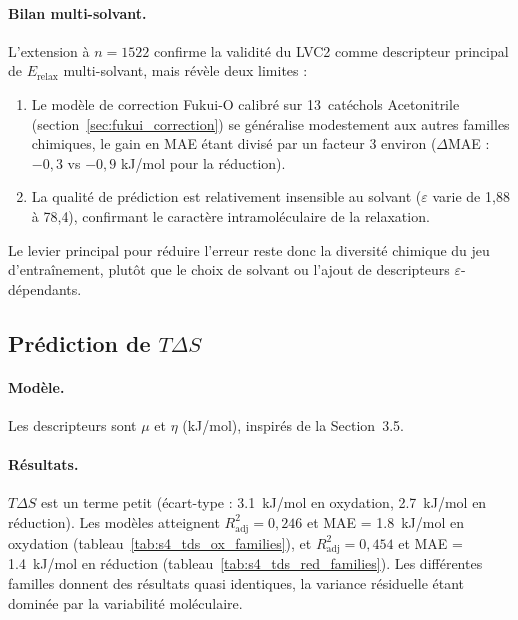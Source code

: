 \paragraph{Bilan multi-solvant.}
L'extension à $n = 1522$ confirme la validité du LVC2 comme descripteur principal de $E_\text{relax}$ multi-solvant, mais révèle deux limites :
\begin{enumerate}
    \item Le modèle de correction Fukui-O calibré sur 13~catéchols Acetonitrile (section~\ref{sec:fukui_correction}) se généralise modestement aux autres familles chimiques, le gain en MAE étant divisé par un facteur 3 environ ($\Delta$MAE : $-0{,}3$ vs $-0{,}9$ kJ/mol pour la réduction).
    \item La qualité de prédiction est relativement insensible au solvant ($\varepsilon$ varie de 1{,}88 à 78{,}4), confirmant le caractère intramoléculaire de la relaxation.
\end{enumerate}
Le levier principal pour réduire l'erreur reste donc la diversité chimique du jeu d'entraînement, plutôt que le choix de solvant ou l'ajout de descripteurs $\varepsilon$-dépendants.

\subsection{Prédiction de \texorpdfstring{$T\Delta S$}{TdS}}
\label{subsec:s4_tds}

\paragraph{Modèle.}
Les descripteurs sont $\mu$ et $\eta$ (kJ/mol), inspirés de la Section~3.5.

\paragraph{Résultats.}
$T\Delta S$ est un terme petit (écart-type : \SI{3.1}{kJ/mol} en oxydation, \SI{2.7}{kJ/mol} en réduction). Les modèles atteignent $R^2_\text{adj} = 0{,}246$ et MAE = \SI{1.8}{kJ/mol} en oxydation (tableau~\ref{tab:s4_tds_ox_families}), et $R^2_\text{adj} = 0{,}454$ et MAE = \SI{1.4}{kJ/mol} en réduction (tableau~\ref{tab:s4_tds_red_families}). Les différentes familles donnent des résultats quasi identiques, la variance résiduelle étant dominée par la variabilité moléculaire.

